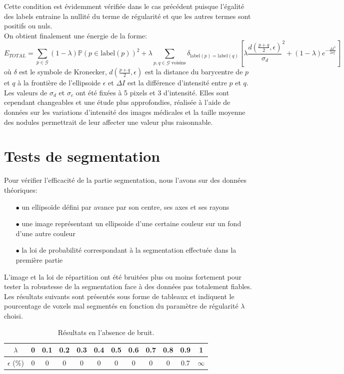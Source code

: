 \documentclass{article}
\newcommand{\lab}{\text{label}}
\begin{document}
Cette condition est évidemment vérifiée dans le cas précédent puisque l'égalité des labels entraine la nullité du terme de régularité et que les autres termes sont positifs ou nuls.\\
On obtient finalement une énergie de la forme:
\[
	E_{TOTAL} = \sum_{p \in \mathcal{G}} (1-\lambda)\mathbb{P}(p \in \lab(p))^2 + \lambda \sum _{p,q \in \mathcal{G} \text{ voisins}} \delta_{\lab(p) = \lab(q)} \left[ \lambda \frac{d\left(\frac{p+q}{2}, \epsilon \right)}{\sigma_d}^2 + (1-\lambda) e^{-\frac{\Delta I^2}{2\sigma_c^2}} \right]
\]
où $\delta$ est le symbole de Kronecker, $d\left(\frac{p+q}{2}, \epsilon \right)$ est la distance du barycentre de $p$ et $q$ à la frontière de l'ellipsoide $\epsilon$ et $\Delta I$ est la différence d'intensité entre $p$ et $q$. Les valeurs de $\sigma_d$ et $\sigma_c$ ont été fixées à 5 pixels et 3 d'intensité. Elles sont cependant changeables et une étude plus approfondies, réalisée à l'aide de données sur les variations d'intensité des images médicales et la taille moyenne des nodules permettrait de leur affecter une valeur plus raisonnable.

\section{Tests de segmentation}

Pour vérifier l'efficacité de la partie segmentation, nous l'avons sur des données théoriques:
\begin{itemize}
	\item[$\bullet$] un ellipsoïde défini par avance par son centre, ses axes et ses rayons
	\item[$\bullet$] une image représentant un ellipsoide d'une certaine couleur sur un fond d'une autre couleur
	\item[$\bullet$] la loi de probabilité correspondant à la segmentation effectuée dans la première partie
\end{itemize} 
L'image et la loi de répartition ont été bruitées plus ou moins fortement pour tester la robustesse de la segmentation face à des données pas totalement fiables.\\
Les résultats suivants sont présentés sous forme de tableaux et indiquent le pourcentage de voxels mal segmentés en fonction du paramètre de régularité $\lambda$ choisi.

\begin{table}[h!]
\begin{center}
  \begin{tabular}{|c|c|c|c|c|c|c|c|c|c|c|c|}
		\hline
		$\lambda$ & 0 & 0.1& 0.2 & 0.3 & 0.4 & 0.5 & 0.6 & 0.7 & 0.8 & 0.9 & 1\\
		\hline
		$\epsilon$ (\%) & 0 & 0 & 0 & 0 & 0 & 0 & 0 & 0 & 0 & 0.7 & $\infty$\\
		\hline
\end{tabular}
\end{center}
\caption{Résultats en l'absence de bruit.}
\end{table}
\end{document}
